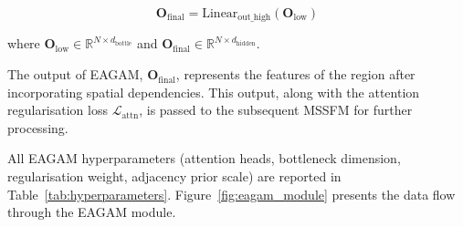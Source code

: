 \documentclass[a4paper,fleqn]{cas-dc}
\begin{document}
\begin{equation}
\mathbf{O}_{\text{final}} = \text{Linear}_{\text{out\_high}}(\mathbf{O}_{\text{low}})
\end{equation}

where $\mathbf{O}_{\text{low}} \in \mathbb{R}^{N \times d_{\text{bottle}}}$ and $\mathbf{O}_{\text{final}} \in \mathbb{R}^{N \times d_{\text{hidden}}}$.

The output of EAGAM, $\mathbf{O}_{\text{final}}$, represents the features of the region after incorporating spatial dependencies. This output, along with the attention regularisation loss $\mathcal{L}_{\text{attn}}$, is passed to the subsequent MSSFM for further processing.

All EAGAM hyperparameters (attention heads, bottleneck dimension, regularisation weight, adjacency prior scale) are reported in Table~\ref{tab:hyperparameters}. Figure~\ref{fig:eagam_module} presents the data flow through the EAGAM module.
\end{document}

